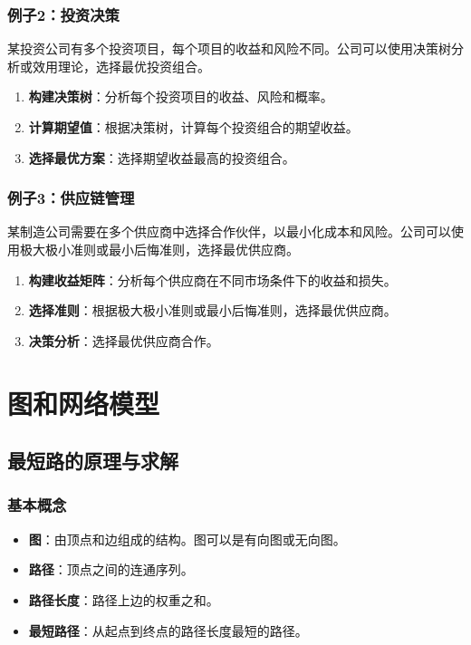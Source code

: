 \documentclass[UTF8]{ctexart}
\begin{document}
\subsubsection {例子2：投资决策}
某投资公司有多个投资项目，每个项目的收益和风险不同。公司可以使用决策树分析或效用理论，选择最优投资组合。
\begin{enumerate}
    \item \textbf{构建决策树}：分析每个投资项目的收益、风险和概率。
    \item \textbf{计算期望值}：根据决策树，计算每个投资组合的期望收益。
    \item \textbf{选择最优方案}：选择期望收益最高的投资组合。
\end{enumerate}

\subsubsection {例子3：供应链管理}
某制造公司需要在多个供应商中选择合作伙伴，以最小化成本和风险。公司可以使用极大极小准则或最小后悔准则，选择最优供应商。
\begin{enumerate}
    \item \textbf{构建收益矩阵}：分析每个供应商在不同市场条件下的收益和损失。
    \item \textbf{选择准则}：根据极大极小准则或最小后悔准则，选择最优供应商。
    \item \textbf{决策分析}：选择最优供应商合作。
\end{enumerate}

\newpage

\section {图和网络模型}
\subsection {最短路的原理与求解}
\subsubsection {基本概念}
\begin{itemize}
    \item \textbf{图}：由顶点和边组成的结构。图可以是有向图或无向图。
    \item \textbf{路径}：顶点之间的连通序列。
    \item \textbf{路径长度}：路径上边的权重之和。
    \item \textbf{最短路径}：从起点到终点的路径长度最短的路径。
\end{itemize}
\end{document}
